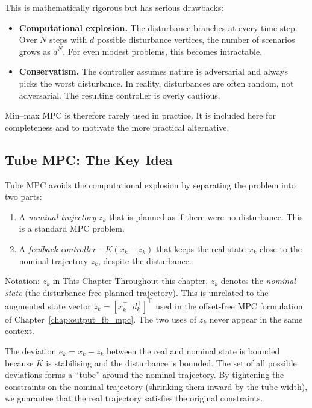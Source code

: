 This is mathematically rigorous but has serious drawbacks:
\begin{itemize}[noitemsep]
	\item \textbf{Computational explosion.} The disturbance branches at every time step. Over $N$ steps with $d$ possible disturbance vertices, the number of scenarios grows as $d^N$. For even modest problems, this becomes intractable.
	\item \textbf{Conservatism.} The controller assumes nature is adversarial and always picks the worst disturbance. In reality, disturbances are often random, not adversarial. The resulting controller is overly cautious.
\end{itemize}

Min--max MPC is therefore rarely used in practice. It is included here for completeness and to motivate the more practical alternative.

\subsection{Tube MPC: The Key Idea}

Tube MPC avoids the computational explosion by separating the problem into two parts:
\begin{enumerate}
	\item A \emph{nominal trajectory} $z_k$ that is planned as if there were no disturbance. This is a standard MPC problem.
	\item A \emph{feedback controller} $-K(x_k - z_k)$ that keeps the real state $x_k$ close to the nominal trajectory $z_k$, despite the disturbance.
\end{enumerate}

\begin{notebox}{Notation: $z_k$ in This Chapter}
	Throughout this chapter, $z_k$ denotes the \emph{nominal state} (the disturbance-free planned trajectory). This is unrelated to the augmented state vector $z_k = [x_k^\top\;\; d_k^\top]^\top$ used in the offset-free MPC formulation of Chapter~\ref{chap:output_fb_mpc}. The two uses of $z_k$ never appear in the same context.
\end{notebox}

The deviation $e_k = x_k - z_k$ between the real and nominal state is bounded because $K$ is stabilising and the disturbance is bounded. The set of all possible deviations forms a ``tube'' around the nominal trajectory. By tightening the constraints on the nominal trajectory (shrinking them inward by the tube width), we guarantee that the real trajectory satisfies the original constraints.

